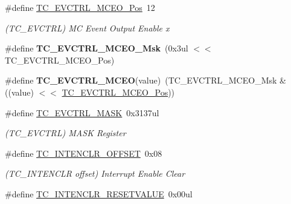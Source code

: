 \begin{DoxyCompactItemize}
\item 
\hypertarget{group___s_a_m_l21___t_c_ga1d8a09101193dedc3736a23697bd4909}{}\#define \hyperlink{group___s_a_m_l21___t_c_ga1d8a09101193dedc3736a23697bd4909}{T\+C\+\_\+\+E\+V\+C\+T\+R\+L\+\_\+\+M\+C\+E\+O\+\_\+\+Pos}~12\label{group___s_a_m_l21___t_c_ga1d8a09101193dedc3736a23697bd4909}

\begin{DoxyCompactList}\small\item\em (T\+C\+\_\+\+E\+V\+C\+T\+R\+L) M\+C Event Output Enable x \end{DoxyCompactList}\item 
\hypertarget{group___s_a_m_l21___t_c_ga559fcfaeb425e5b9f7202c54c90211d2}{}\#define {\bfseries T\+C\+\_\+\+E\+V\+C\+T\+R\+L\+\_\+\+M\+C\+E\+O\+\_\+\+Msk}~(0x3ul $<$$<$ T\+C\+\_\+\+E\+V\+C\+T\+R\+L\+\_\+\+M\+C\+E\+O\+\_\+\+Pos)\label{group___s_a_m_l21___t_c_ga559fcfaeb425e5b9f7202c54c90211d2}

\item 
\hypertarget{group___s_a_m_l21___t_c_ga991d2330782b614efdc5700652f82011}{}\#define {\bfseries T\+C\+\_\+\+E\+V\+C\+T\+R\+L\+\_\+\+M\+C\+E\+O}(value)~(T\+C\+\_\+\+E\+V\+C\+T\+R\+L\+\_\+\+M\+C\+E\+O\+\_\+\+Msk \& ((value) $<$$<$ \hyperlink{group___s_a_m_l21___t_c_ga1d8a09101193dedc3736a23697bd4909}{T\+C\+\_\+\+E\+V\+C\+T\+R\+L\+\_\+\+M\+C\+E\+O\+\_\+\+Pos}))\label{group___s_a_m_l21___t_c_ga991d2330782b614efdc5700652f82011}

\item 
\hypertarget{group___s_a_m_l21___t_c_ga317a47bc3562fba35f3c759ee8c26b47}{}\#define \hyperlink{group___s_a_m_l21___t_c_ga317a47bc3562fba35f3c759ee8c26b47}{T\+C\+\_\+\+E\+V\+C\+T\+R\+L\+\_\+\+M\+A\+S\+K}~0x3137ul\label{group___s_a_m_l21___t_c_ga317a47bc3562fba35f3c759ee8c26b47}

\begin{DoxyCompactList}\small\item\em (T\+C\+\_\+\+E\+V\+C\+T\+R\+L) M\+A\+S\+K Register \end{DoxyCompactList}\item 
\hypertarget{group___s_a_m_l21___t_c_ga4e6711338c10a71c069a50745717a03c}{}\#define \hyperlink{group___s_a_m_l21___t_c_ga4e6711338c10a71c069a50745717a03c}{T\+C\+\_\+\+I\+N\+T\+E\+N\+C\+L\+R\+\_\+\+O\+F\+F\+S\+E\+T}~0x08\label{group___s_a_m_l21___t_c_ga4e6711338c10a71c069a50745717a03c}

\begin{DoxyCompactList}\small\item\em (T\+C\+\_\+\+I\+N\+T\+E\+N\+C\+L\+R offset) Interrupt Enable Clear \end{DoxyCompactList}\item 
\hypertarget{group___s_a_m_l21___t_c_ga8d98dff5fe8a86a1fe16e3782d6029e4}{}\#define \hyperlink{group___s_a_m_l21___t_c_ga8d98dff5fe8a86a1fe16e3782d6029e4}{T\+C\+\_\+\+I\+N\+T\+E\+N\+C\+L\+R\+\_\+\+R\+E\+S\+E\+T\+V\+A\+L\+U\+E}~0x00ul\label{group___s_a_m_l21___t_c_ga8d98dff5fe8a86a1fe16e3782d6029e4}


\end{DoxyCompactItemize}
